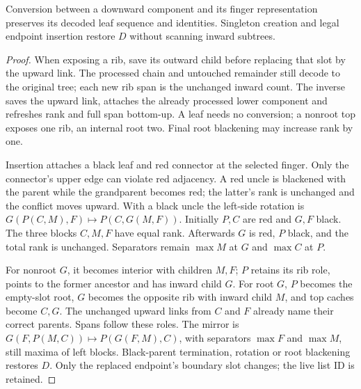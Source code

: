 \begin{lemma}
\label{lem:proof-insert}
Conversion between a downward component and its finger representation
preserves its decoded leaf sequence and identities. Singleton creation and
legal endpoint insertion restore $D$ without scanning inward subtrees.
\end{lemma}
\begin{proof}
When exposing a rib, save its outward child before replacing that slot by
the upward link. The processed chain and untouched remainder still decode
to the original tree; each new rib span is the unchanged inward count.
The inverse saves the upward link, attaches the already processed lower
component and refreshes rank and full span bottom-up. A leaf needs no
conversion; a nonroot top exposes one rib, an internal root two. Final root
blackening may increase rank by one.

Insertion attaches a black leaf and red connector at the selected finger.
Only the connector's upper edge can violate red adjacency. A red uncle is
blackened with the parent while the grandparent becomes red; the latter's
rank is unchanged and the conflict moves upward. With a black uncle the
left-side rotation is
$G(P(C,M),F)\mapsto P(C,G(M,F))$.
Initially $P,C$ are red and $G,F$ black. The three blocks $C,M,F$ have equal
rank. Afterwards $G$ is red, $P$ black, and the total rank is unchanged.
Separators remain $\max M$ at $G$ and $\max C$ at $P$.

For nonroot $G$, it becomes interior with children $M,F$; $P$ retains its
rib role, points to the former ancestor and has inward child $G$. For root
$G$, $P$ becomes the empty-slot root, $G$ becomes the opposite rib with
inward child $M$, and top caches become $C,G$. The unchanged upward links
from $C$ and $F$ already name their correct parents. Spans follow these roles.
The mirror is $G(F,P(M,C))\mapsto P(G(F,M),C)$, with separators $\max F$
and $\max M$, still maxima of left blocks. Black-parent termination,
rotation or root blackening restores $D$. Only the replaced endpoint's
boundary slot changes; the live list ID is retained.
\end{proof}

